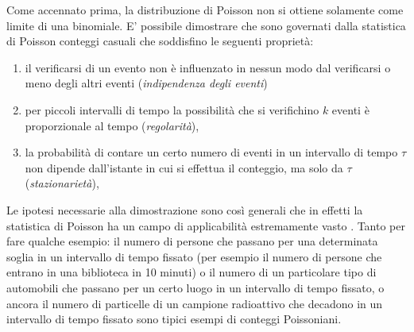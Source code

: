 \noindent Come accennato prima, la distribuzione di Poisson non si ottiene
solamente come limite di una binomiale.
E' possibile dimostrare \cite{Bevington} che sono governati dalla
statistica di Poisson conteggi casuali che soddisfino le seguenti propriet\`a:
\begin{enumerate}
\item il verificarsi di un evento non \`e influenzato in nessun modo
dal verificarsi o meno degli altri eventi ({\itshape indipendenza degli
eventi})
\item per piccoli intervalli di tempo la possibilit\`a che si verifichino
$k$ eventi \`e proporzionale al tempo ({\itshape regolarit\`a}),
\item la probabilit\`a di contare un certo numero di eventi in un
intervallo di tempo $\tau$ non dipende dall'istante in cui si effettua il
conteggio, ma solo da $\tau$ ({\itshape stazionariet\`a}),
\end{enumerate}
Le ipotesi necessarie alla dimostrazione sono cos\`i generali che in effetti
la statistica di Poisson ha un campo di applicabilit\`a estremamente vasto
\cite{Lafleur}.
Tanto per fare qualche esempio: il numero di persone che passano per una
determinata soglia in un intervallo di tempo fissato (per esempio il numero
di persone che entrano in una biblioteca in 10 minuti) o il numero di un
particolare tipo di automobili che passano per un certo luogo in un intervallo
di tempo fissato, o ancora il numero di particelle di un campione radioattivo
che decadono in un intervallo di tempo fissato sono tipici esempi di conteggi
Poissoniani.

